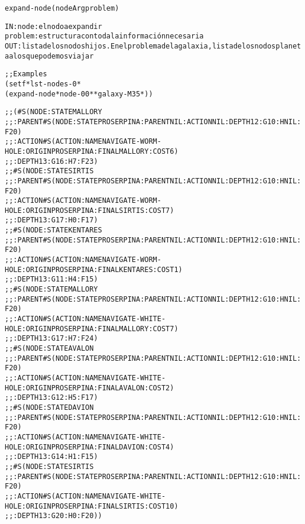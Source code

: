 \begin{aibox}{\function}
\begin{alltt}
expand-node (nodeArg problem)


IN: 	node: el nodo a expandir
	problem: estructura con toda la información necesaria
OUT: lista de los nodos hijos. En el problema de la galaxia, lista de los nodos planeta a los que podemos viajar

\end{alltt}
\end{aibox}

\begin{aibox}{\examples}
\begin{alltt}
;; Examples
(setf *lst-nodes-0*
	(expand-node *node-00* *galaxy-M35*))

;; (\#S(NODE :STATE MALLORY
;;    :PARENT  \#S(NODE :STATE PROSERPINA :PARENT NIL :ACTION NIL :DEPTH 12 :G 10 :H NIL :F 20)
;;    :ACTION  \#S(ACTION :NAME NAVIGATE-WORM-HOLE :ORIGIN PROSERPINA :FINAL MALLORY :COST 6)
;;    :DEPTH 13 :G 16 :H 7 :F 23)
;; \#S(NODE :STATE SIRTIS
;;    :PARENT  \#S(NODE :STATE PROSERPINA :PARENT NIL :ACTION NIL :DEPTH 12 :G 10 :H NIL :F 20)
;;    :ACTION  \#S(ACTION :NAME NAVIGATE-WORM-HOLE :ORIGIN PROSERPINA :FINAL SIRTIS :COST 7)
;;    :DEPTH 13 :G 17 :H 0 :F 17)
;; \#S(NODE :STATE KENTARES
;;    :PARENT  \#S(NODE :STATE PROSERPINA :PARENT NIL :ACTION NIL :DEPTH 12 :G 10 :H NIL :F 20)
;;    :ACTION  \#S(ACTION :NAME NAVIGATE-WORM-HOLE :ORIGIN PROSERPINA :FINAL KENTARES :COST 1)
;;    :DEPTH 13 :G 11 :H 4 :F 15)
;; \#S(NODE :STATE MALLORY
;;    :PARENT  \#S(NODE :STATE PROSERPINA :PARENT NIL :ACTION NIL :DEPTH 12 :G 10 :H NIL :F 20)
;;    :ACTION  \#S(ACTION :NAME NAVIGATE-WHITE-HOLE :ORIGIN PROSERPINA :FINAL MALLORY :COST 7)
;;    :DEPTH 13 :G 17 :H 7 :F 24)
;; \#S(NODE :STATE AVALON
;;    :PARENT  \#S(NODE :STATE PROSERPINA :PARENT NIL :ACTION NIL :DEPTH 12 :G 10 :H NIL :F 20)
;;    :ACTION  \#S(ACTION :NAME NAVIGATE-WHITE-HOLE :ORIGIN PROSERPINA :FINAL AVALON :COST 2)
;;    :DEPTH 13 :G 12 :H 5 :F 17)
;; \#S(NODE :STATE DAVION
;;    :PARENT  \#S(NODE :STATE PROSERPINA :PARENT NIL :ACTION NIL :DEPTH 12 :G 10 :H NIL :F 20)
;;    :ACTION  \#S(ACTION :NAME NAVIGATE-WHITE-HOLE :ORIGIN PROSERPINA :FINAL DAVION :COST 4)
;;    :DEPTH 13 :G 14 :H 1 :F 15)
;; \#S(NODE :STATE SIRTIS
;;    :PARENT  \#S(NODE :STATE PROSERPINA :PARENT NIL :ACTION NIL :DEPTH 12 :G 10 :H NIL :F 20)
;;    :ACTION  \#S(ACTION :NAME NAVIGATE-WHITE-HOLE :ORIGIN PROSERPINA :FINAL SIRTIS :COST 10)
;;    :DEPTH 13 :G 20 :H 0 :F 20))



\end{alltt}
\end{aibox}

